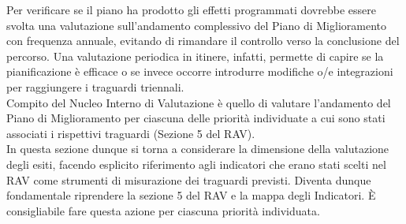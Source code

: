\documentclass[12pt,a4paper,oneside]{memoir}
\begin{document}
Per verificare se il piano ha prodotto gli effetti programmati dovrebbe essere svolta una valutazione sull'andamento complessivo del Piano di Miglioramento con frequenza annuale, evitando di rimandare il controllo verso la conclusione del percorso. Una valutazione periodica in itinere, infatti, permette di capire se la pianificazione è efficace o se invece occorre introdurre modifiche o/e integrazioni per raggiungere i traguardi triennali.\\

Compito del Nucleo Interno di Valutazione è quello di valutare l'andamento del Piano di Miglioramento per ciascuna delle priorità individuate a cui sono stati associati i rispettivi traguardi (Sezione 5 del RAV).\\

 

In questa sezione dunque si torna a considerare la dimensione della valutazione degli esiti, facendo esplicito riferimento agli indicatori che erano stati scelti nel RAV come strumenti di misurazione dei traguardi previsti. Diventa dunque fondamentale riprendere la sezione 5 del RAV e la mappa degli Indicatori. È consigliabile fare questa azione per ciascuna priorità individuata.\\
\end{document}
